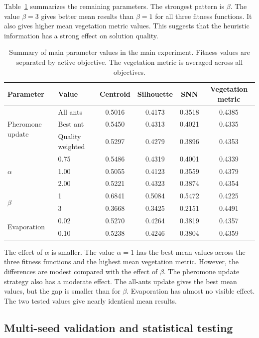 \documentclass[11pt]{article}
\begin{document}
Table~\ref{tab:main_parameter_summary} summarizes the remaining parameters. The strongest pattern is $\beta$. The value $\beta=3$ gives better mean results than $\beta=1$ for all three fitness functions. It also gives higher mean vegetation metric values. This suggests that the heuristic information has a strong effect on solution quality.

\begin{table}[ht]
\centering
\caption{Summary of main parameter values in the main experiment. Fitness values are separated by active objective. The vegetation metric is averaged across all objectives.}
\label{tab:main_parameter_summary}
\begin{tabular}{llcccc}
\hline
\textbf{Parameter} & \textbf{Value} & \textbf{Centroid} & \textbf{Silhouette} & \textbf{SNN} & \textbf{Vegetation metric} \\
\hline
\multirow{3}{*}{Pheromone update} & All ants & 0.5016 & 0.4173 & 0.3518 & 0.4385 \\
 & Best ant & 0.5450 & 0.4313 & 0.4021 & 0.4335 \\
 & Quality weighted & 0.5297 & 0.4279 & 0.3896 & 0.4353 \\
\hline
\multirow{3}{*}{$\alpha$} & 0.75 & 0.5486 & 0.4319 & 0.4001 & 0.4339 \\
 & 1.00 & 0.5055 & 0.4123 & 0.3559 & 0.4379 \\
 & 2.00 & 0.5221 & 0.4323 & 0.3874 & 0.4354 \\
\hline
\multirow{2}{*}{$\beta$} & 1 & 0.6841 & 0.5084 & 0.5472 & 0.4225 \\
 & 3 & 0.3668 & 0.3425 & 0.2151 & 0.4491 \\
\hline
\multirow{2}{*}{Evaporation} & 0.02 & 0.5270 & 0.4264 & 0.3819 & 0.4357 \\
 & 0.10 & 0.5238 & 0.4246 & 0.3804 & 0.4359 \\
\hline
\end{tabular}
\end{table}

The effect of $\alpha$ is smaller. The value $\alpha=1$ has the best mean values across the three fitness functions and the highest mean vegetation metric. However, the differences are modest compared with the effect of $\beta$. The pheromone update strategy also has a moderate effect. The all-ants update gives the best mean values, but the gap is smaller than for $\beta$. Evaporation has almost no visible effect. The two tested values give nearly identical mean results.

\subsection{Multi-seed validation and statistical testing}
\end{document}
